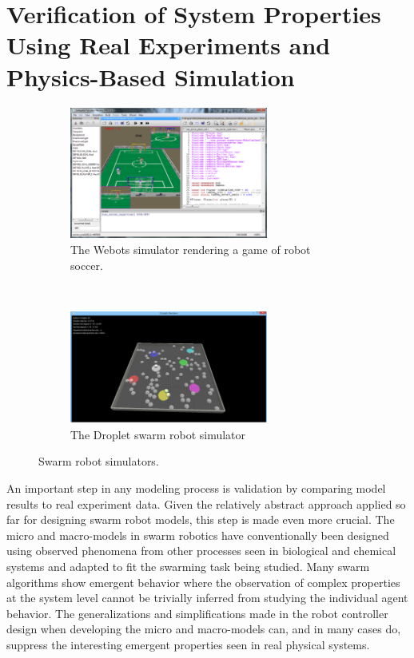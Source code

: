 \documentclass[defaultstyle,12pt]{proposal}
\begin{document}
\section{Verification of System Properties Using Real Experiments and Physics-Based Simulation}
\begin{figure}[!tb]
\begin{subfigure}{.5\textwidth}
\centering\includegraphics[width=6.5cm]{../assets/Webots.png}
\centering\caption{The Webots simulator rendering a game of robot soccer.}\label{fig:webots}
\end{subfigure}~
\begin{subfigure}{.5\textwidth}
\centering\includegraphics[width=6.5cm]{../assets/dsim.png}
\centering\caption{The Droplet swarm robot simulator}\label{fig:dropletsim}
\end{subfigure}
\caption{Swarm robot simulators.}
\end{figure}

An important step in any modeling process is validation by comparing model results to real experiment data. Given the relatively abstract approach applied so far for designing swarm robot models, this step is made even more crucial. The micro and macro-models in swarm robotics have conventionally been designed using observed phenomena from other processes seen in biological and chemical systems and adapted to fit the swarming task being studied. Many swarm algorithms show emergent behavior where the observation of complex properties at the system level cannot be trivially inferred from studying the individual agent behavior. The generalizations and simplifications made in the robot controller design when developing the micro and macro-models can, and in many cases do, suppress the interesting emergent properties seen in real physical systems. 
\end{document}
